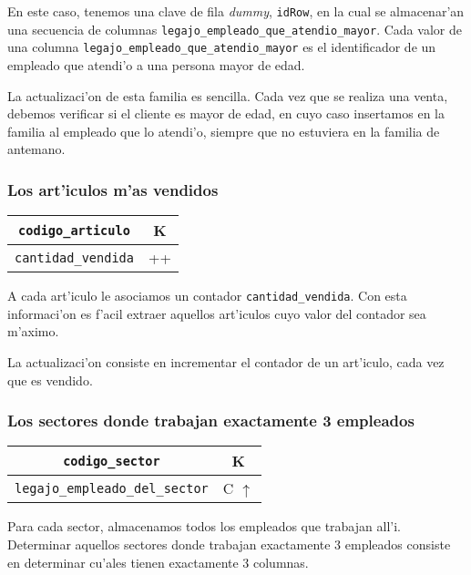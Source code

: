 En este caso, tenemos una clave de fila \textit{dummy}, \texttt{idRow}, en la cual se almacenar'an una secuencia de columnas \texttt{legajo\_empleado\_que\_atendio\_mayor}. Cada valor de una columna \texttt{legajo\_empleado\_que\_atendio\_mayor} es el identificador de un empleado que atendi'o a una persona mayor de edad.

La actualizaci'on de esta familia es sencilla. Cada vez que se realiza una venta, debemos verificar si el cliente es mayor de edad, en cuyo caso insertamos en la familia al empleado que lo atendi'o, siempre que no estuviera en la familia de antemano.

\subsubsection{Los art'iculos m'as vendidos}

\begin{center}
\begin{tabular}{|c|c|}
\hline
\texttt{codigo\_articulo} & K\\
\hline
\texttt{cantidad\_vendida} & ++\\
\hline
\end{tabular}
\end{center}

A cada art'iculo le asociamos un contador \texttt{cantidad\_vendida}. Con esta informaci'on es f'acil extraer aquellos art'iculos cuyo valor del contador sea m'aximo.

La actualizaci'on consiste en incrementar el contador de un art'iculo, cada vez que es vendido.

\subsubsection{Los sectores donde trabajan exactamente 3 empleados}

\begin{center}
\begin{tabular}{|c|c|}
\hline
\texttt{codigo\_sector} & K\\
\hline
\texttt{legajo\_empleado\_del\_sector} & C $\uparrow$\\
\hline
\end{tabular}
\end{center}

Para cada sector, almacenamos todos los empleados que trabajan all'i. Determinar aquellos sectores donde trabajan exactamente 3 empleados consiste en determinar cu'ales tienen exactamente 3 columnas.

